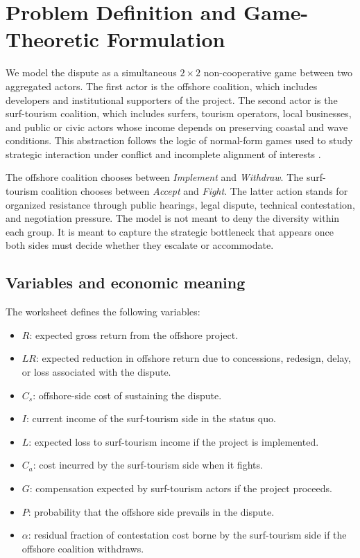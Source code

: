 \section{Problem Definition and Game-Theoretic Formulation}
\label{sec_model}

We model the dispute as a simultaneous $2\times2$ non-cooperative game between two aggregated actors. The first actor is the offshore coalition, which includes developers and institutional supporters of the project. The second actor is the surf-tourism coalition, which includes surfers, tourism operators, local businesses, and public or civic actors whose income depends on preserving coastal and wave conditions. This abstraction follows the logic of normal-form games used to study strategic interaction under conflict and incomplete alignment of interests \citep{gillman2019,sobhee_game_2017}.

The offshore coalition chooses between \textit{Implement} and \textit{Withdraw}. The surf-tourism coalition chooses between \textit{Accept} and \textit{Fight}. The latter action stands for organized resistance through public hearings, legal dispute, technical contestation, and negotiation pressure. The model is not meant to deny the diversity within each group. It is meant to capture the strategic bottleneck that appears once both sides must decide whether they escalate or accommodate.

\subsection{Variables and economic meaning}

The worksheet defines the following variables:

\begin{itemize}
\item $R$: expected gross return from the offshore project.
\item $LR$: expected reduction in offshore return due to concessions, redesign, delay, or loss associated with the dispute.
\item $C_s$: offshore-side cost of sustaining the dispute.
\item $I$: current income of the surf-tourism side in the status quo.
\item $L$: expected loss to surf-tourism income if the project is implemented.
\item $C_a$: cost incurred by the surf-tourism side when it fights.
\item $G$: compensation expected by surf-tourism actors if the project proceeds.
\item $P$: probability that the offshore side prevails in the dispute.
\item $\alpha$: residual fraction of contestation cost borne by the surf-tourism side if the offshore coalition withdraws.
\end{itemize}

